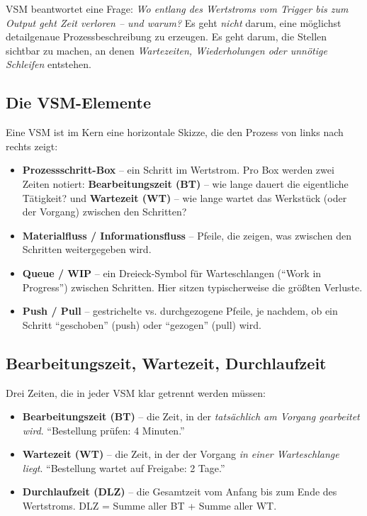 \documentclass[11pt,a4paper,oneside]{article}
\newcommand{\fachbegriff}[1]{\textbf{#1}}
\begin{document}
VSM beantwortet eine Frage: \emph{Wo entlang des Wertstroms vom Trigger bis zum Output geht Zeit verloren -- und warum?} Es geht \emph{nicht} darum, eine möglichst detailgenaue Prozessbeschreibung zu erzeugen. Es geht darum, die Stellen sichtbar zu machen, an denen \emph{Wartezeiten, Wiederholungen oder unnötige Schleifen} entstehen.

\subsection{Die VSM-Elemente}

Eine VSM ist im Kern eine horizontale Skizze, die den Prozess von links nach rechts zeigt:

\begin{itemize}
  \item \fachbegriff{Prozessschritt-Box} -- ein Schritt im Wertstrom. Pro Box werden zwei Zeiten notiert: \fachbegriff{Bearbeitungszeit (BT)} -- wie lange dauert die eigentliche Tätigkeit? und \fachbegriff{Wartezeit (WT)} -- wie lange wartet das Werkstück (oder der Vorgang) zwischen den Schritten?
  \item \fachbegriff{Materialfluss / Informationsfluss} -- Pfeile, die zeigen, was zwischen den Schritten weitergegeben wird.
  \item \fachbegriff{Queue / WIP} -- ein Dreieck-Symbol für Warteschlangen (``Work in Progress'') zwischen Schritten. Hier sitzen typischerweise die größten Verluste.
  \item \fachbegriff{Push / Pull} -- gestrichelte vs. durchgezogene Pfeile, je nachdem, ob ein Schritt ``geschoben'' (push) oder ``gezogen'' (pull) wird.
\end{itemize}

\subsection{Bearbeitungszeit, Wartezeit, Durchlaufzeit}

Drei Zeiten, die in jeder VSM klar getrennt werden müssen:

\begin{itemize}
  \item \fachbegriff{Bearbeitungszeit (BT)} -- die Zeit, in der \emph{tatsächlich am Vorgang gearbeitet wird}. ``Bestellung prüfen: 4 Minuten.''
  \item \fachbegriff{Wartezeit (WT)} -- die Zeit, in der der Vorgang \emph{in einer Warteschlange liegt}. ``Bestellung wartet auf Freigabe: 2 Tage.''
  \item \fachbegriff{Durchlaufzeit (DLZ)} -- die Gesamtzeit vom Anfang bis zum Ende des Wertstroms. DLZ = Summe aller BT + Summe aller WT.
\end{itemize}
\end{document}
